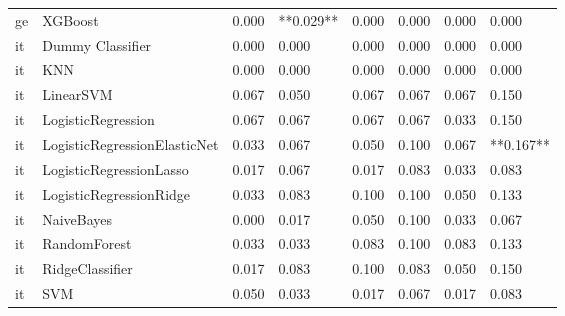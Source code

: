 \begin{tabular}{llllllll}
      ge &                      XGBoost & 0.000 &                 **0.029** &                 0.000 &                  0.000 &                                   0.000 &     0.000 \\
      it &             Dummy Classifier & 0.000 &                     0.000 &                 0.000 &                  0.000 &                                   0.000 &     0.000 \\
      it &                          KNN & 0.000 &                     0.000 &                 0.000 &                  0.000 &                                   0.000 &     0.000 \\
      it &                    LinearSVM & 0.067 &                     0.050 &                 0.067 &                  0.067 &                                   0.067 &     0.150 \\
      it &           LogisticRegression & 0.067 &                     0.067 &                 0.067 &                  0.067 &                                   0.033 &     0.150 \\
      it & LogisticRegressionElasticNet & 0.033 &                     0.067 &                 0.050 &                  0.100 &                                   0.067 & **0.167** \\
      it &      LogisticRegressionLasso & 0.017 &                     0.067 &                 0.017 &                  0.083 &                                   0.033 &     0.083 \\
      it &      LogisticRegressionRidge & 0.033 &                     0.083 &                 0.100 &                  0.100 &                                   0.050 &     0.133 \\
      it &                   NaiveBayes & 0.000 &                     0.017 &                 0.050 &                  0.100 &                                   0.033 &     0.067 \\
      it &                 RandomForest & 0.033 &                     0.033 &                 0.083 &                  0.100 &                                   0.083 &     0.133 \\
      it &              RidgeClassifier & 0.017 &                     0.083 &                 0.100 &                  0.083 &                                   0.050 &     0.150 \\
      it &                          SVM & 0.050 &                     0.033 &                 0.017 &                  0.067 &                                   0.017 &     0.083 \\

\end{tabular}

